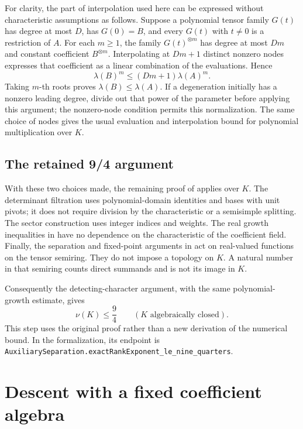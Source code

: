 \documentclass[11pt]{article}
\theoremstyle{remark}
\numberwithin{equation}{section}
\begin{document}
For clarity, the part of interpolation used here can be expressed
without characteristic assumptions as follows. Suppose a polynomial
tensor family $G(t)$ has degree at most $D$, has $G(0)=B$, and every
$G(t)$ with $t\ne0$ is a restriction of $A$. For each $m\geq1$,
the family $G(t)^{\otimes m}$ has degree at most $Dm$ and constant
coefficient $B^{\otimes m}$. Interpolating at $Dm+1$ distinct nonzero
nodes expresses that coefficient as a linear combination of the
evaluations. Hence
\[
\lambda(B)^m\leq(Dm+1)\lambda(A)^m.
\]
Taking $m$-th roots proves $\lambda(B)\leq\lambda(A)$.
If a degeneration initially has a nonzero leading degree, divide
out that power of the parameter before applying this argument;
the nonzero-node condition permits this normalization.
The same choice of nodes gives the usual evaluation and interpolation
bound for polynomial multiplication over $K$.

\subsection{The retained 9/4 argument}

With these two choices made, the remaining proof of \cite{OAI}
applies over $K$. The determinant filtration uses polynomial-domain
identities and bases with unit pivots; it does not require division
by the characteristic or a semisimple splitting. The sector
construction uses integer indices and weights. The real growth
inequalities in \cite[Sections~4--5]{OAI} have no dependence on the
characteristic of the coefficient field. Finally, the separation and
fixed-point arguments in \cite[Appendix~A]{OAI} act on real-valued
functions on the tensor semiring. They do not impose a topology on
$K$. A natural number in that semiring counts direct summands and
is not its image in $K$.

Consequently the detecting-character argument, with the same
polynomial-growth estimate, gives
\begin{equation}\label{eq:closed}
\nu(K)\leq\frac94\qquad(K\text{ algebraically closed}).
\end{equation}
This step uses the original proof rather than a new derivation of
the numerical bound. In the formalization, its endpoint is
\nolinkurl{AuxiliarySeparation.exactRankExponent_le_nine_quarters}.

\section{Descent with a fixed coefficient algebra}\label{sec:descent}
\end{document}
